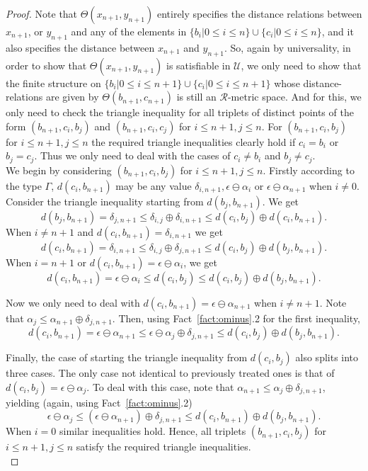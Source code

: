 \documentclass{article}
\theoremstyle{remark}
\theoremstyle{definition}
\newcommand{\U}[0]{\mathbb{U}}
\renewcommand{\U}[0]{\mathcal{U}}
\renewcommand\leq{\leqslant}
\newcommand{\rr}[0]{\mathcal{R}}
\begin{document}
{{{{{\begin{proof}
Note that $\Theta(x_{n+1}, y_{n+1})$ entirely specifies the distance relations between $x_{n+1}$, or $y_{n+1}$ and any of the elements in $\{b_i\vert 0\leq i\leq n\}\cup\{c_i\vert 0\leq i\leq n\}$, and it also specifies the distance between $x_{n+1}$ and $y_{n+1}$. So, again by universality, in order to show that $\Theta(x_{n+1}, y_{n+1})$ is satisfiable in $\U$, we only need to show that the finite structure on $\{b_i\vert 0\leq i\leq n+1\}\cup\{c_i\vert 0\leq i\leq n+1\}$ whose distance-relations are given by $\Theta(b_{n+1}, c_{n+1})$ is still an $\rr$-metric space.
And for this, we only need to check the triangle inequality for all triplets of distinct points of the form $(b_{n+1}, c_i, b_j)$ and $(b_{n+1}, c_i, c_j)$ for $i\leq n+1, j\leq n$. %
  For $(b_{n+1}, c_i, b_j)$  for $i\leq n+1, j\leq n$ the required triangle inequalities {clearly hold} if $c_i= b_i$ or $ b_j=c_j$. Thus we only need to deal with the cases of $c_i\neq  b_i$ and $ b_j\neq c_j$.\\ 

We begin by considering $(b_{n+1}, c_i, b_j)$ for $i\leq n+1, j\leq n$. Firstly according to the type $\Gamma$, $d(c_i, b_{n+1})$ may be any  value $\delta_{i, n+1}, \epsilon\ominus\alpha_i$ or $\epsilon\ominus\alpha_{n+1}$ when $i\neq 0$.  
Consider the triangle inequality starting from $d(b_j, b_{n+1})$. We get
\[d(b_j, b_{n+1})=\delta_{j, n+1}\leq \delta_{i, j}\oplus\delta_{i, n+1}\leq d(c_i, b_j)\oplus d(c_i, b_{n+1}).\]
When $i\neq n+1$ and  $d(c_i, b_{n+1})=\delta_{i, n+1}$ we get 
\[d(c_i, b_{n+1})=\delta_{i, n+1}\leq \delta_{i,j}\oplus\delta_{j, n+1}\leq d(c_i, b_j)\oplus d(b_j, b_{n+1}).\]
When $i=n+1$ or $d(c_i,b_{n+1})=\epsilon \ominus\alpha_i$, we get
\[d(c_i, b_{n+1})=\epsilon\ominus\alpha_i\leq d(c_i, b_j)\leq d(c_i, b_j)\oplus d(b_j, b_{n+1}).\]

Now we only need to deal with  $d(c_i,b_{n+1})=\epsilon \ominus\alpha_{n+1}$ when $i\neq n+1$. Note that $\alpha_j\leq \alpha_{n+1}\oplus \delta_{j,n+1}$. Then, using Fact~\ref{fact:ominus}.2 for the first inequality,
\[d(c_i,b_{n+1})=\epsilon\ominus\alpha_{n+1}\leq \epsilon \ominus\alpha_j\oplus\delta_{j,n+1}\leq d(c_i,b_j)\oplus d(b_j,b_{n+1}).\]

Finally, the case of starting the triangle inequality from $d(c_i, b_j)$ also splits into three cases. The only case not identical to previously treated ones is that of $d(c_i, b_j)=\epsilon\ominus\alpha_j$. To deal with this case, note that $\alpha_{n+1}\leq \alpha_j\oplus \delta_{j, n+1}$, yielding (again, using Fact~\ref{fact:ominus}.2)
\[\epsilon\ominus\alpha_j\leq (\epsilon\ominus\alpha_{n+1}){\oplus}\delta_{j, n+1}\leq d(c_i, b_{n+1})\oplus d(b_j, b_{n+1}).\]
When $i=0$ similar inequalities hold. Hence, all triplets $(b_{n+1}, c_i, b_j)$ for $i\leq n+1, j\leq n$ satisfy the required triangle inequalities.\\


\end{proof}}}}}}
\end{document}
